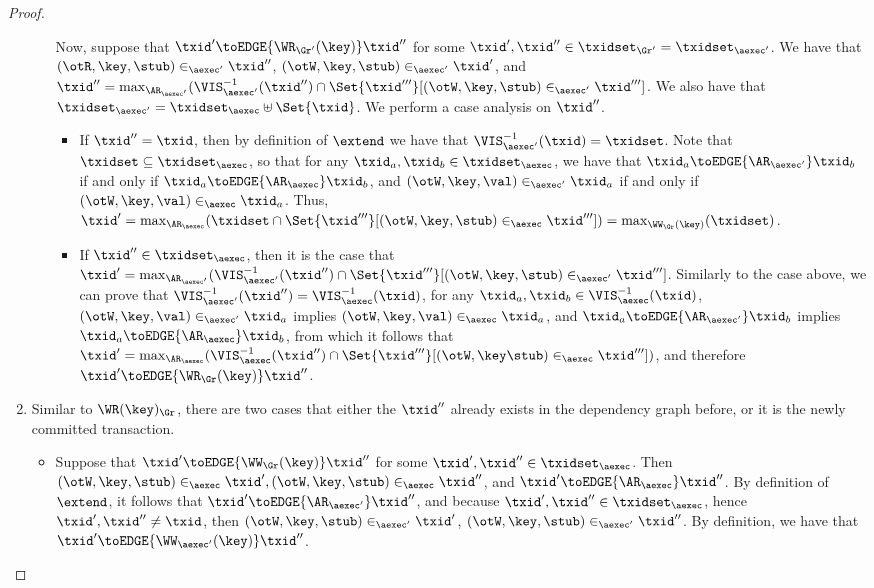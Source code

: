 \begin{proof}
\begin{enumerate}
\begin{itemize}
Now, suppose that $\txid' \toEDGE{\WR_{\Gr'}(\key)} \txid''$ for some $\txid', \txid'' \in \txidset_{\Gr'} = 
\txidset_{\aexec'}$. We have that $ (\otR, \key, \stub) \in_{\aexec'} \txid''$, 
$(\otW, \key, \stub) \in_{\aexec'} \txid'$, and $\txid'' = \max_{\AR_{\aexec'}}(\VIS_{\aexec'}^{-1}(\txid'') 
\cap \Set{\txid'''}[(\otW, \key, \stub) \in_{\aexec'} \txid''']$. 
We also have that $\txidset_{\aexec'} = \txidset_{\aexec} \uplus \Set{\txid}$. We perform a case 
analysis on $\txid''$. 

\begin{itemize}
\item If $\txid'' = \txid$, then by definition of $\extend$ we have that 
$\VIS^{-1}_{\aexec'}(\txid) = \txidset$. Note that $\txidset \subseteq \txidset_{\aexec}$, so that 
for any $\txid_{a}, \txid_{b} \in \txidset_{\aexec}$, we have that $\txid_{a} \toEDGE{\AR_{\aexec'}} \txid_{b}$ 
if and only if $\txid_{a} \toEDGE{\AR_{\aexec}} \txid_{b}$, 
and $(\otW, \key, \val) \in_{\aexec'} \txid_{a}$ if and only if $(\otW, \key, \val) \in_{\aexec} \txid_{a}$. 
Thus, $\txid' = \max_{\AR_{\aexec}}(\txidset 
\cap \Set{\txid'''}[(\otW, \key, \stub) \in_{\aexec} \txid''']) = \max_{\WW_{\Gr}(\key)}(\txidset)$. 

\item If $\txid'' \in \txidset_{\aexec}$, then it is the case that 
    $\txid' = \max_{\AR_{\aexec'}}(\VIS^{-1}_{\aexec'}(\txid'') \cap \Set{ \txid'''}[(\otW, \key, \stub) \in_{\aexec'} \txid''']$. 
Similarly to the case above, we can prove that $\VIS^{-1}_{\aexec'}(\txid'') = \VIS^{-1}_{\aexec}(\txid)$, 
for any $\txid_{a}, \txid_{b} \in \VIS^{-1}_{\aexec}(\txid)$, $(\otW, \key, \val) \in_{\aexec'} \txid_{a}$ 
implies $(\otW, \key, \val) \in_{\aexec} \txid_{a}$, and $\txid_{a} \toEDGE{\AR_{\aexec'}} \txid_{b}$ 
implies $\txid_{a} \toEDGE{\AR_{\aexec}} \txid_{b}$, from which it follows that 
$\txid' = \max_{\AR_{\aexec}}(\VIS^{-1}_{\aexec}(\txid'') \cap \Set{\txid'''}[(\otW, \key \stub) \in_{\aexec} \txid'''])$, 
and therefore $\txid' \toEDGE{\WR_{\Gr}(\key)} \txid''$.
\end{itemize}
\end{itemize}

\item 
Similar to \( \WR(\key)_{\Gr} \), there are two cases that either the \( \txid'' \) already exists in the dependency graph before,
or it is the newly committed transaction.
\begin{itemize}
\item Suppose that $\txid' \toEDGE{\WW_{\Gr}(\key)} \txid''$ for some $\txid', \txid'' \in \txidset_{\aexec}$. 
Then $(\otW,\key,\stub) \in_{\aexec} \txid', (\otW, \key, \stub) \in_{\aexec} \txid''$, and $\txid' \toEDGE{\AR_{\aexec}} \txid''$. 
By definition of $\extend$, it follows that $\txid' \toEDGE{\AR_{\aexec'}} \txid''$, and because 
$\txid', \txid'' \in \txidset_{\aexec}$, hence $\txid', \txid'' \neq \txid$, then 
$(\otW,\key, \stub) \in_{\aexec'} \txid'$, $(\otW, \key, \stub) \in_{\aexec'} \txid''$. By definition, 
we have that $\txid' \toEDGE{\WW_{\aexec'}(\key)} \txid''$.


\end{itemize}
\end{enumerate}
\end{proof}
